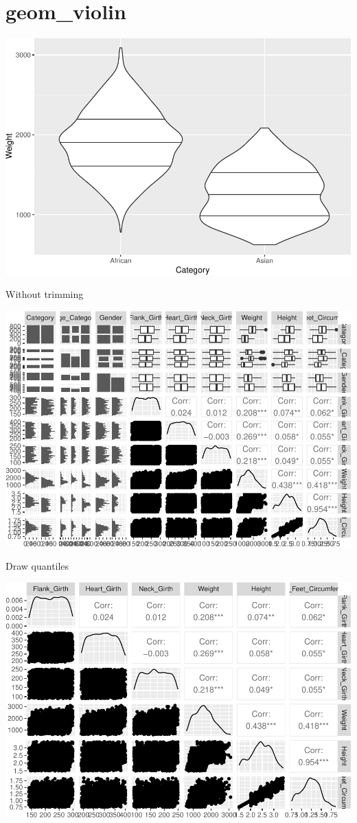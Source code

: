 \documentclass[
]{book}
\begin{document}
\hypertarget{geom_violin}{%
\section{geom\_violin}\label{geom_violin}}

\includegraphics{Data-Visualisation-geom-Encyclopedia_files/figure-latex/unnamed-chunk-53-1.pdf}

Without trimming

\includegraphics{Data-Visualisation-geom-Encyclopedia_files/figure-latex/unnamed-chunk-54-1.pdf}

Draw quantiles

\includegraphics{Data-Visualisation-geom-Encyclopedia_files/figure-latex/unnamed-chunk-55-1.pdf}
\end{document}
